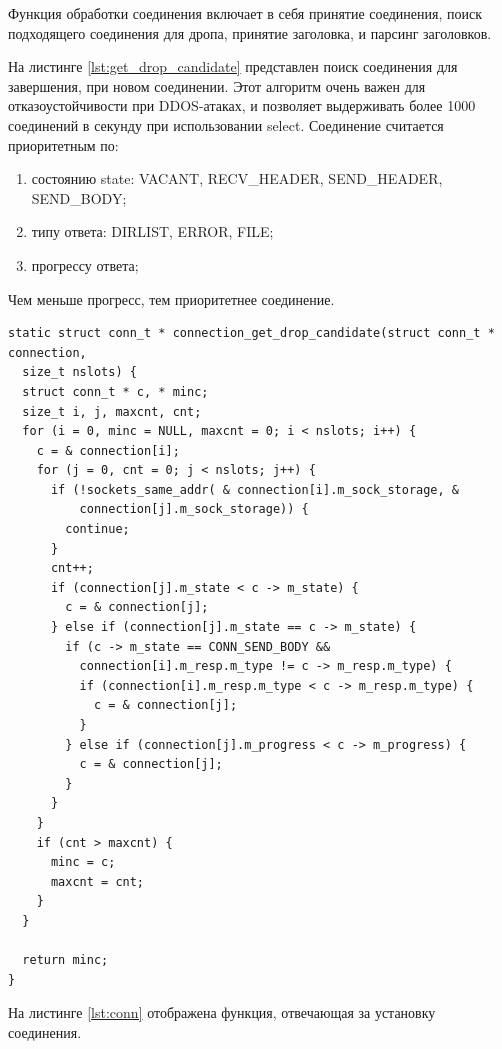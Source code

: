 Функция обработки соединения включает в себя принятие соединения, поиск подходящего соединения для дропа, принятие заголовка, и парсинг заголовков.

На листинге \ref{lst:get_drop_candidate} представлен поиск соединения для завершения, при новом соединении. Этот алгоритм очень важен для отказоустойчивости при DDOS-атаках, и позволяет выдерживать более 1000 соединений в секунду при использовании select.
Соединение считается приоритетным по:

\begin{enumerate}
    \item состоянию state: VACANT, RECV\_HEADER,
    SEND\_HEADER, SEND\_BODY;
    \item типу ответа: DIRLIST, ERROR, FILE;
    \item прогрессу ответа;
\end{enumerate}

Чем меньше прогресс, тем приоритетнее соединение.

\captionsetup{singlelinecheck = false, justification=raggedright}
\begin{lstlisting}[label=lst:get_drop_candidate,caption=Поиск соединения для отключения]
static struct conn_t * connection_get_drop_candidate(struct conn_t * connection,
  size_t nslots) {
  struct conn_t * c, * minc;
  size_t i, j, maxcnt, cnt;
  for (i = 0, minc = NULL, maxcnt = 0; i < nslots; i++) {
    c = & connection[i];
    for (j = 0, cnt = 0; j < nslots; j++) {
      if (!sockets_same_addr( & connection[i].m_sock_storage, &
          connection[j].m_sock_storage)) {
        continue;
      }
      cnt++;
      if (connection[j].m_state < c -> m_state) {
        c = & connection[j];
      } else if (connection[j].m_state == c -> m_state) {
        if (c -> m_state == CONN_SEND_BODY &&
          connection[i].m_resp.m_type != c -> m_resp.m_type) {
          if (connection[i].m_resp.m_type < c -> m_resp.m_type) {
            c = & connection[j];
          }
        } else if (connection[j].m_progress < c -> m_progress) {
          c = & connection[j];
        }
      }
    }
    if (cnt > maxcnt) {
      minc = c;
      maxcnt = cnt;
    }
  }

  return minc;
}
\end{lstlisting}

На листинге \ref{lst:conn} отображена функция, отвечающая за установку соединения.

